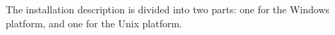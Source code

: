 \documentclass[\pformat,12pt]{article}
\newcommand{\Toolbox}{VDMTools}
\newcommand{\Toolbox}{VDMTools}
\begin{document}
The installation description is divided into two parts: one for the
Windows platform, and one for the Unix platform.


\newpage





  

\end{document}
